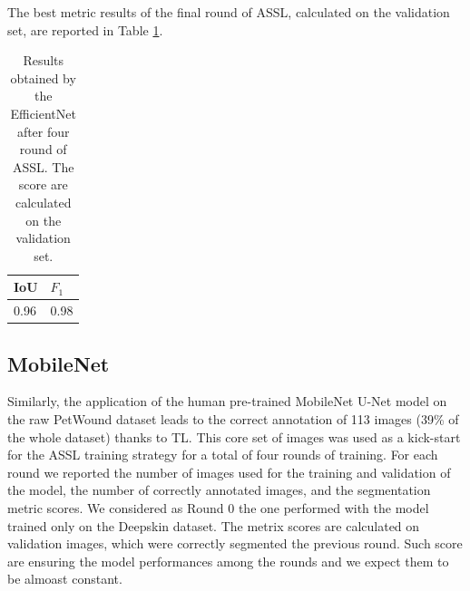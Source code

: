 \documentclass[../main.tex]{subfiles}
\begin{document}
The best metric results of the final round of ASSL, calculated on the validation set, are reported in Table \ref{tab:results-eff-score-petwound}.
\begin{table}[H]
    \centering
    
    \begin{tabular}{|l|l|}
    \hline
          IoU  & $F_1$  \\ \hline
        0.96 & 0.98 \\ \hline
    \end{tabular}
    \caption{Results obtained by the EfficientNet after four round of ASSL. The score are calculated on the validation set.}\label{tab:results-eff-score-petwound}
\end{table}

\subsection{MobileNet}
Similarly, the application of the human pre-trained MobileNet U-Net model on the raw PetWound dataset leads to the correct annotation of 113 images (39\% of the whole dataset) thanks to TL. This core set of images was used as a kick-start for the ASSL training strategy for a total of four rounds of training.
For each round we reported the number of images used for the training and validation of the model, the number of correctly annotated images, and the segmentation metric scores. We considered as Round 0 the one performed with the model trained only on the Deepskin dataset.
The metrix scores are calculated on validation images, which were correctly segmented the previous round. 
Such score are ensuring the model performances among the rounds and we expect them to be almoast constant.
\end{document}

